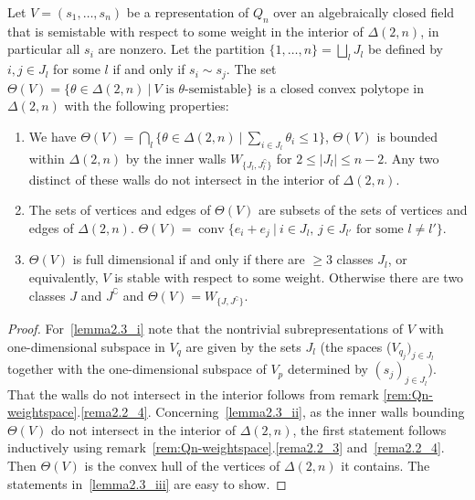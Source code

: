 \documentclass[ALCO,ThmDefs,Unicode,epreuves]{cedram}
\DeclareMathOperator{\conv}{conv}
\begin{document}
\begin{lemma}\label{lemma:repr-pol-Qn}
Let $V=(s_1,\ldots,s_n)$ be a representation of $Q_n$ over an algebraically closed 
field that is semistable with respect to some weight in the interior of $\Delta(2,n)$,
in particular all $s_i$ are nonzero. Let the partition $\{1,\ldots,n\}=\bigsqcup_lJ_l$ 
be defined by $i,j\in J_l$ for some $l$ if and only if $s_i\sim s_j$.
The set $\Theta(V)=\{\theta\in\Delta(2,n)\:|\:\text{$V$ is $\theta$-semistable}\}$ 
is a closed convex polytope in $\Delta(2,n)$ with the following properties:

\begin{enumerate}[label=(\alph*)]
\item\label{lemma2.3_i} We have 
$\Theta(V)=\bigcap_l\{\theta\in\Delta(2,n)\:|\:\sum_{i\in J_l}\theta_i\leq 1\}$,
\ie $\Theta(V)$ is bounded within $\Delta(2,n)$ by the inner walls 
$W_{\{J_l,J_l^\complement\}}$ for $2\leq|J_l|\leq n-2$. Any two distinct of 
these walls do not intersect in the interior of $\Delta(2,n)$.

\item\label{lemma2.3_ii} The sets of vertices and edges of $\Theta(V)$ are subsets of the sets 
of vertices and edges of $\Delta(2,n)$.
$\Theta(V)=\conv\{e_i+e_j\:|\:\text{$i\in J_l$, $j\in J_{l'}$ for some $l\neq l'$}\}$.

\item\label{lemma2.3_iii} $\Theta(V)$ is full dimensional if and only if there are $\geq3$
classes $J_l$, or equivalently, $V$ is stable with respect to some
weight. Otherwise there are two classes $J$ and $J^\complement$ and 
$\Theta(V)=W_{\{J,J^\complement\}}$.
\end{enumerate}
\end{lemma}
\begin{proof} 
For~\ref{lemma2.3_i} note that the nontrivial subrepresentations of $V$ with one-dimensional 
subspace in $V_q$ are given by the sets $J_l$ (the spaces ($V_{q_j})_{j\in J_l}$ 
together with the one-dimensional subspace of $V_p$ determined by $(s_j)_{j\in J_l}$). 
That the walls do not intersect in the interior follows from remark 
\ref{rem:Qn-weightspace}.\ref{rema2.2_4}.
Concerning~\ref{lemma2.3_ii}, as the inner walls bounding $\Theta(V)$ do not intersect in the
interior of $\Delta(2,n)$, the first statement follows inductively using
remark~\ref{rem:Qn-weightspace}.\ref{rema2.2_3} and~\ref{rema2.2_4}. Then $\Theta(V)$ is the convex hull
of the vertices of $\Delta(2,n)$ it contains.
The statements in~\ref{lemma2.3_iii} are easy to show.
\end{proof}
\end{document}
